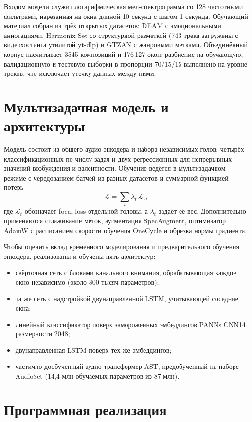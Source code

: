 \documentclass[master,summary]{pmk-graduate}
\begin{document}
Входом модели служит логарифмическая мел-спектрограмма со 128 частотными
фильтрами, нарезанная на окна длиной 10 секунд с шагом 1 секунда. Обучающий
материал собран из трёх открытых датасетов: DEAM с эмоциональными аннотациями,
Harmonix Set со структурной разметкой (743 трека загружены с видеохостинга
утилитой yt-dlp) и GTZAN с жанровыми метками. Объединённый корпус насчитывает
3545 композиций и 176\,127 окон; разбиение на обучающую, валидационную и тестовую
выборки в пропорции 70/15/15 выполнено на уровне треков, что исключает утечку
данных между ними.

\section{Мультизадачная модель и архитектуры}

Модель состоит из общего аудио-энкодера и набора независимых голов: четырёх
классификационных по числу задач и двух регрессионных для непрерывных значений
возбуждения и валентности. Обучение ведётся в мультизадачном режиме с чередованием
батчей из разных датасетов и суммарной функцией потерь
\[
\mathcal{L} = \sum_{t} \lambda_t\, \mathcal{L}_t ,
\]
где \(\mathcal{L}_t\) обозначает focal loss отдельной головы, а \(\lambda_t\)
задаёт её вес. Дополнительно применяются сглаживание меток, аугментация
SpecAugment, оптимизатор AdamW с расписанием скорости обучения OneCycle и обрезка
нормы градиента.

Чтобы оценить вклад временного моделирования и предварительного обучения
энкодера, реализованы и обучены пять архитектур:
\begin{itemize}
\item свёрточная сеть с блоками канального внимания, обрабатывающая каждое окно
независимо (около 800 тысяч параметров);
\item та же сеть с надстройкой двунаправленной LSTM, учитывающей соседние окна;
\item линейный классификатор поверх замороженных эмбеддингов PANNs CNN14
размерности 2048;
\item двунаправленная LSTM поверх тех же эмбеддингов;
\item частично дообученный аудио-трансформер AST, предобученный на наборе
AudioSet (14,4 млн обучаемых параметров из 87 млн).
\end{itemize}

\section{Программная реализация}
\end{document}
